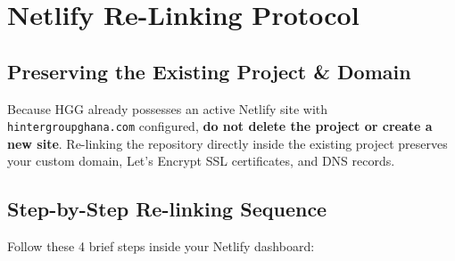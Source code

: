 \documentclass[11pt,a4paper,oneside]{book}
\begin{document}
\chapter{Netlify Re-Linking Protocol}

\section{Preserving the Existing Project \& Domain}
Because HGG already possesses an active Netlify site with \texttt{hintergroupghana.com} configured, \textbf{do not delete the project or create a new site}. Re-linking the repository directly inside the existing project preserves your custom domain, Let's Encrypt SSL certificates, and DNS records.

\section{Step-by-Step Re-linking Sequence}

Follow these 4 brief steps inside your Netlify dashboard:
\end{document}

